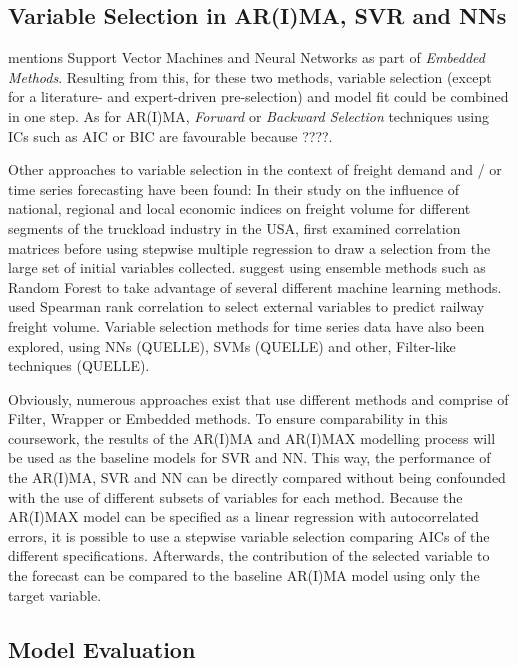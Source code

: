 \documentclass[a4paper, 11pt]{article}
\begin{document}
\subsection{Variable Selection in AR(I)MA, SVR and NNs}
\cite{Chandrashekar.2014} mentions Support Vector Machines and Neural Networks as part of \textit{Embedded Methods}. Resulting from this, for these two methods, variable selection (except for a literature- and expert-driven pre-selection) and model fit could be combined in one step. As for AR(I)MA, \textit{Forward} or \textit{Backward Selection} techniques using ICs such as AIC or BIC are favourable because ????.

Other approaches to variable selection in the context of freight demand and / or time series forecasting have been found:
In their study on the influence of national, regional and local economic indices on freight volume for different segments of the truckload industry in the USA, \cite{Fite.2002} first examined correlation matrices before using stepwise multiple regression to draw a selection from the large set of initial variables collected. 
\cite{Taghizadeh.2017} suggest using ensemble methods such as Random Forest to take advantage of several different machine learning methods.
\cite{Feng.2018} used Spearman rank correlation to select external variables to predict railway freight volume.
Variable selection methods for time series data have also been explored, using NNs (QUELLE), SVMs (QUELLE) and other, Filter-like techniques (QUELLE).

Obviously, numerous approaches exist that use different methods and comprise of Filter, Wrapper or Embedded methods. To ensure comparability in this coursework, the results of the AR(I)MA and AR(I)MAX modelling process will be used as the baseline models for SVR and NN. This way, the performance of the AR(I)MA, SVR and NN can be directly compared without being confounded with the use of different subsets of variables for each method.
Because the AR(I)MAX model can be specified as a linear regression with autocorrelated errors, it is possible to use a stepwise variable selection comparing AICs of the different specifications. Afterwards, the contribution of the selected variable to the forecast can be compared to the baseline AR(I)MA model using only the target variable.

\subsection{Model Evaluation}
\end{document}
